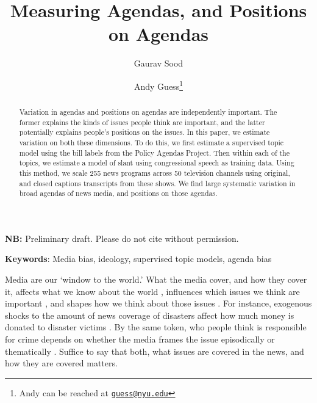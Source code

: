 \documentclass[12pt, letterpaper]{article}
\title{Measuring Agendas, and Positions on Agendas}
\author{Gaurav Sood \and Andy Guess\thanks{Andy can be reached at \href{mailto:guess@nyu.edu}{\texttt{guess@nyu.edu}}}\vspace{.5cm}}
\begin{document}
\maketitle
\thispagestyle{empty}

\begin{center}
\vspace{.5cm}\textbf{NB:} Preliminary draft. Please do not cite without permission.\vspace{1.5cm}
\end{center}

\begin{abstract}
\noindent Variation in agendas and positions on agendas are independently important. The former explains the kinds of issues people think are important, and the latter potentially explains people's positions on the issues. In this paper, we estimate variation on both these dimensions. To do this, we first estimate a supervised topic model using the bill labels from the Policy Agendas Project. Then within each of the topics, we estimate a model of slant using congressional speech as training data. Using this method, we scale 255 news programs across 50 television channels using original, and closed captions transcripts from these shows. We find large systematic variation in broad agendas of news media, and positions on those agendas.  
\end{abstract}

\textbf{Keywords}: Media bias, ideology, supervised topic models, agenda bias

\clearpage
\doublespace
Media are our `window to the world.' What the media cover, and how they cover it, affects what we know about the world \citep{jerit2006citizens}, influences which issues we think are important \citep{mccombs1972agenda, behr1985, iyengar1993news}, and shapes how we think about those issues \citep[for e.g.][]{iyengar1990framing, iyengar1996framing}. For instance, exogenous shocks to the amount of news coverage of disasters affect how much money is donated to disaster victims \citep{eisensee2007news}. By the same token, who people think is responsible for crime depends on whether the media frames the issue episodically or thematically \citep{iyengar1989citizens}. Suffice to say that both, what issues are covered in the news, and how they are covered matters.
\end{document}

